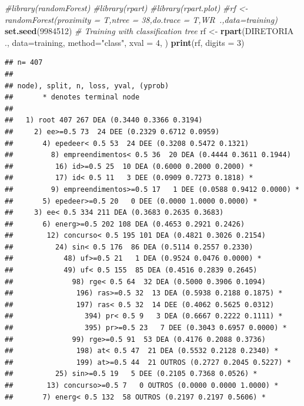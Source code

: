 \documentclass[]{article}
\newenvironment{Shaded}{\begin{snugshade}}{\end{snugshade}}
\newcommand{\KeywordTok}[1]{\textcolor[rgb]{0.13,0.29,0.53}{\textbf{#1}}}
\newcommand{\DataTypeTok}[1]{\textcolor[rgb]{0.13,0.29,0.53}{#1}}
\newcommand{\DecValTok}[1]{\textcolor[rgb]{0.00,0.00,0.81}{#1}}
\newcommand{\StringTok}[1]{\textcolor[rgb]{0.31,0.60,0.02}{#1}}
\newcommand{\CommentTok}[1]{\textcolor[rgb]{0.56,0.35,0.01}{\textit{#1}}}
\newcommand{\OperatorTok}[1]{\textcolor[rgb]{0.81,0.36,0.00}{\textbf{#1}}}
\newcommand{\NormalTok}[1]{#1}
\begin{document}
\begin{Shaded}
\begin{Highlighting}[]
\CommentTok{#library(randomForest)}
\CommentTok{#library(rpart)}
\CommentTok{#library(rpart.plot)}
\CommentTok{#rf <- randomForest(proximity = T,ntree = 38,do.trace = T,WR~.,data=training)}
\KeywordTok{set.seed}\NormalTok{(}\DecValTok{9984512}\NormalTok{)}
\CommentTok{# Training with classification tree}
\NormalTok{rf <-}\StringTok{ }\KeywordTok{rpart}\NormalTok{(DIRETORIA }\OperatorTok{~}\StringTok{ }\NormalTok{., }\DataTypeTok{data=}\NormalTok{training, }\DataTypeTok{method=}\StringTok{"class"}\NormalTok{, }\DataTypeTok{xval =} \DecValTok{4}\NormalTok{, )}
\KeywordTok{print}\NormalTok{(rf, }\DataTypeTok{digits =} \DecValTok{3}\NormalTok{)}
\end{Highlighting}
\end{Shaded}

\begin{verbatim}
## n= 407 
## 
## node), split, n, loss, yval, (yprob)
##       * denotes terminal node
## 
##   1) root 407 267 DEA (0.3440 0.3366 0.3194)  
##     2) ee>=0.5 73  24 DEE (0.2329 0.6712 0.0959)  
##       4) epedeer< 0.5 53  24 DEE (0.3208 0.5472 0.1321)  
##         8) empreendimentos< 0.5 36  20 DEA (0.4444 0.3611 0.1944)  
##          16) id>=0.5 25  10 DEA (0.6000 0.2000 0.2000) *
##          17) id< 0.5 11   3 DEE (0.0909 0.7273 0.1818) *
##         9) empreendimentos>=0.5 17   1 DEE (0.0588 0.9412 0.0000) *
##       5) epedeer>=0.5 20   0 DEE (0.0000 1.0000 0.0000) *
##     3) ee< 0.5 334 211 DEA (0.3683 0.2635 0.3683)  
##       6) energ>=0.5 202 108 DEA (0.4653 0.2921 0.2426)  
##        12) concurso< 0.5 195 101 DEA (0.4821 0.3026 0.2154)  
##          24) sin< 0.5 176  86 DEA (0.5114 0.2557 0.2330)  
##            48) uf>=0.5 21   1 DEA (0.9524 0.0476 0.0000) *
##            49) uf< 0.5 155  85 DEA (0.4516 0.2839 0.2645)  
##              98) rge< 0.5 64  32 DEA (0.5000 0.3906 0.1094)  
##               196) ras>=0.5 32  13 DEA (0.5938 0.2188 0.1875) *
##               197) ras< 0.5 32  14 DEE (0.4062 0.5625 0.0312)  
##                 394) pr< 0.5 9   3 DEA (0.6667 0.2222 0.1111) *
##                 395) pr>=0.5 23   7 DEE (0.3043 0.6957 0.0000) *
##              99) rge>=0.5 91  53 DEA (0.4176 0.2088 0.3736)  
##               198) at< 0.5 47  21 DEA (0.5532 0.2128 0.2340) *
##               199) at>=0.5 44  21 OUTROS (0.2727 0.2045 0.5227) *
##          25) sin>=0.5 19   5 DEE (0.2105 0.7368 0.0526) *
##        13) concurso>=0.5 7   0 OUTROS (0.0000 0.0000 1.0000) *
##       7) energ< 0.5 132  58 OUTROS (0.2197 0.2197 0.5606) *
\end{verbatim}
\end{document}
